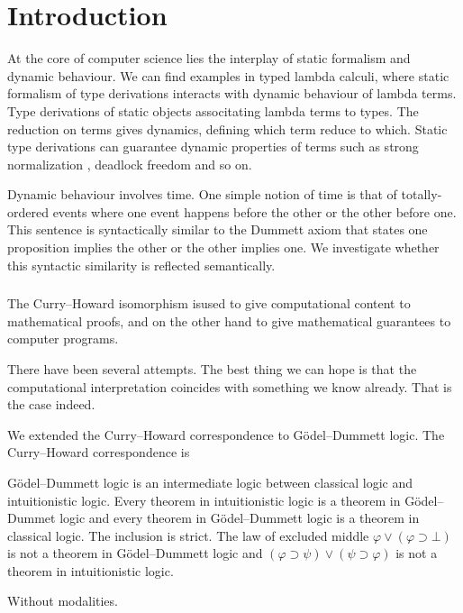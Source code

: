 \chapter{Introduction}

At the core of computer science lies the interplay of static formalism
and dynamic behaviour.  We can find examples in typed lambda calculi,
where static formalism of type derivations interacts with dynamic
behaviour of lambda terms.
Type derivations of static objects associtating lambda terms to types.
The reduction on terms gives dynamics, defining which term reduce
to which.  Static type derivations can guarantee dynamic properties of
terms such as strong normalization , deadlock freedom
and so on.

Dynamic behaviour involves time.
One simple notion of time is that of totally-ordered events where
one event happens before the other or the other before one.
This sentence is syntactically similar to the Dummett axiom that states
one proposition implies the other or the other implies one.
We investigate whether this syntactic similarity is reflected semantically.

\subsection{}

The Curry--Howard isomorphism isused to give computational content
to mathematical proofs, and on the other hand to give mathematical
guarantees to computer programs.


There have been several attempts.
The best thing we can hope is that the computational
interpretation coincides with something we know already.
That is the case indeed.

We extended the Curry--Howard correspondence to G\"odel--Dummett logic.
The Curry--Howard correspondence is 

G\"odel--Dummett logic is an intermediate logic  between
classical logic and intuitionistic logic.  Every theorem in
intuitionistic logic is a theorem in G\"odel--Dummet logic and every
theorem in G\"odel--Dummett logic is a theorem in classical logic.
The inclusion is strict.  The law of excluded middle
$\varphi\vee(\varphi\supset \bot)$ is not a theorem in G\"odel--Dummett
logic and $(\varphi\supset\psi)\vee(\psi\supset\varphi)$ is not a
theorem in intuitionistic logic.

Without modalities.


